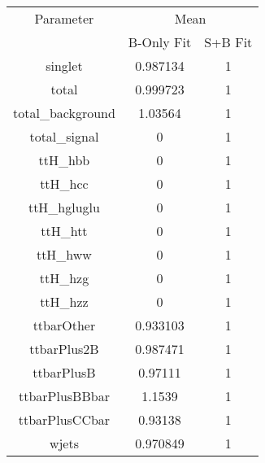 \begin{table}
\centering

\begin{tabular}{ccc}
\toprule
Parameter & \multicolumn{2}{c}{Mean}\\
 & B-Only Fit & S+B Fit\\
\midrule
singlet & \num{0.987134} & \num{1}\\
total & \num{0.999723} & \num{1}\\
total\_background & \num{1.03564} & \num{1}\\
total\_signal & \num{0} & \num{1}\\
ttH\_hbb & \num{0} & \num{1}\\
ttH\_hcc & \num{0} & \num{1}\\
ttH\_hgluglu & \num{0} & \num{1}\\
ttH\_htt & \num{0} & \num{1}\\
ttH\_hww & \num{0} & \num{1}\\
ttH\_hzg & \num{0} & \num{1}\\
ttH\_hzz & \num{0} & \num{1}\\
ttbarOther & \num{0.933103} & \num{1}\\
ttbarPlus2B & \num{0.987471} & \num{1}\\
ttbarPlusB & \num{0.97111} & \num{1}\\
ttbarPlusBBbar & \num{1.1539} & \num{1}\\
ttbarPlusCCbar & \num{0.93138} & \num{1}\\
wjets & \num{0.970849} & \num{1}\\
\bottomrule
\end{tabular}
\end{table}